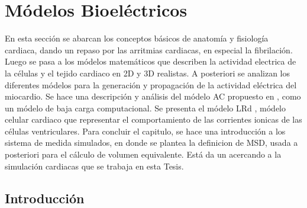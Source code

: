 \chapter{Módelos Bioeléctricos}

\begin{resumen}
  En esta sección se abarcan los conceptos básicos de anatomía y fisiología
  cardiaca, dando un repaso por las arritmias cardiacas, en especial la
  fibrilación. Luego se pasa a los módelos matemáticos que describen la
  actividad electrica de la células y el tejido  cardiaco en 2D y 3D realistas.
  A posteriori se analizan los diferentes módelos para la generación y
  propagación de la actividad eléctrica del miocardio. Se hace una descripción
  y análisis del módelo \ac{AC} propuesto en \cite{Alonso-Atienza05},  como un
  módelo de baja carga computacional. Se presenta el módelo \ac{LRd}
  \cite{luo1994, livshitz2007}, módelo celular cardiaco que representar el
  comportamiento de las corrientes ionicas de las células ventriculares. Para
  concluir el capitulo, se hace una introducción a los sistema de medida
  simulados, en donde se plantea la definicion de \ac{MSD}, usada a posteriori
  para el cálculo de volumen equivalente. Está da un acercando a la simulación cardiacas que se trabaja en esta Tesis.




\end{resumen}


\section{Introducción}

